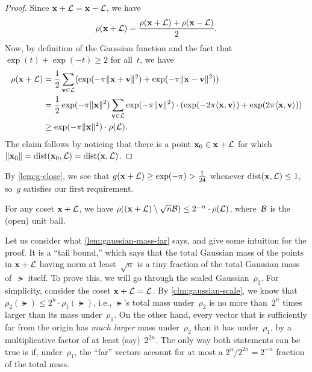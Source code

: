 \documentclass[11pt]{article}
\begin{document}
\begin{proof}
  Since $\mathbf{x}+\mathcal{L} = \mathbf{x}-\mathcal{L}$, we have
  \[ \rho(\mathbf{x}+\mathcal{L}) = \frac{\rho(\mathbf{x}+\mathcal{L}) +
      \rho(\mathbf{x}-\mathcal{L})}{2}. \] Now, by definition of the Gaussian
  function and the fact that $\exp(t) + \exp(-t) \geq 2$ for all~$t$,
  we have
  \begin{align*}
    \rho(\mathbf{x}+\mathcal{L})
    &= \frac12 \sum_{\mathbf{v} \in \mathcal{L}} ( \exp(-\pi \lVert\mathbf{x}+\mathbf{v}\rVert^2)+ \exp(-\pi \lVert\mathbf{x}-\mathbf{v}\rVert^2)) \\
    &= \frac12 \exp(-\pi \lVert\mathbf{x}\rVert^2)
      \sum_{\mathbf{v} \in \mathcal{L}} \exp(-\pi \lVert\mathbf{v}\rVert^2) \cdot
      (\exp(-2\pi \langle\mathbf{x},\mathbf{v}\rangle)+\exp(2\pi \langle\mathbf{x},\mathbf{v}\rangle)) \\
    &\geq \exp(-\pi \lVert\mathbf{x}\rVert^{2}) \cdot \rho(\mathcal{L}) .
  \end{align*}
  The claim follows by noticing that there is a point
  $\mathbf{x}_0 \in \mathbf{x} + \mathcal{L}$ for which
  $\lVert\mathbf{x}_0\rVert=\operatorname{dist}(\mathbf{x}_0,\mathcal{L}) = \operatorname{dist}(\mathbf{x},\mathcal{L})$.
\end{proof}
By \cref{lem:g-close}, we see that
$g(\mathbf{x} + \mathcal{L}) \geq \exp(-\pi) > \tfrac{1}{24}$ whenever
$\operatorname{dist}(\mathbf{x},\mathcal{L}) \leq 1$, so~$g$ satisfies our first requirement.

\begin{lemma}
  \label{lem:gaussian-mass-far}
  For any coset $\mathbf{x} + \mathcal{L}$, we have
  $\rho((\mathbf{x} + \mathcal{L}) \setminus \sqrt{n}\mathcal{B}) \leq 2^{-n} \cdot
  \rho(\mathcal{L})$, where~$\mathcal{B}$ is the (open) unit ball.
\end{lemma}

Let us consider what \cref{lem:gaussian-mass-far} says, and give some
intuition for the proof. It is a ``tail bound,'' which says that the
total Gaussian mass of the points in $\mathbf{x}+\mathcal{L}$ having norm at
least~$\sqrt{n}$ is a tiny fraction of the total Gaussian mass
of~$\lat$ itself. To prove this, we will go through the scaled
Gaussian~$\rho_{2}$. For simplicity, consider the coset
$\mathbf{x}+\mathcal{L}=\mathcal{L}$. By \cref{clm:gaussian-scale}, we know that
$\rho_{2}(\lat) \leq 2^{n} \cdot \rho_{1}(\lat)$, i.e., $\lat$'s total
mass under~$\rho_{2}$ is no more than~$2^{n}$ times larger than its
mass under~$\rho_{1}$. On the other hand, every vector that is
sufficiently far from the origin has \emph{much larger} mass
under~$\rho_{2}$ than it has under~$\rho_{1}$, by a multiplicative
factor of at least (say)~$2^{2n}$. The only way both statements can be
true is if, under~$\rho_{1}$, the ``far'' vectors account for at most
a $2^{n}/2^{2n} = 2^{-n}$ fraction of the total mass.
\end{document}
